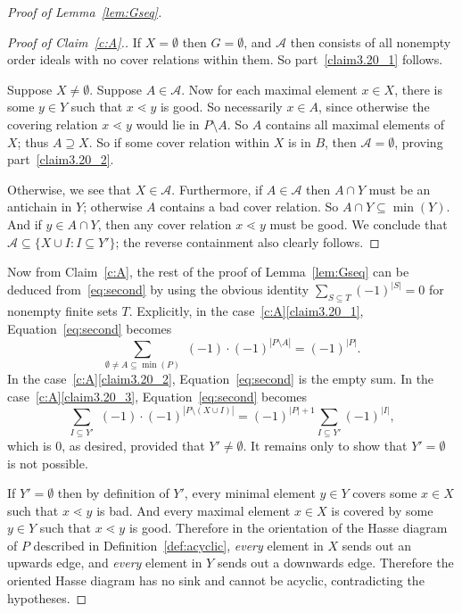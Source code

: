 \documentclass[11pt]{article}
\theoremstyle{definition}
\begin{document}
\begin{proof}[Proof of Lemma~\ref{lem:Gseq}]
\begin{proof}[Proof of Claim~\ref{c:A}.] If $X=\emptyset$ then $G=\emptyset$, and $\mathcal{A}$ then consists of all nonempty order ideals with no cover relations within them. So part~\eqref{claim3.20_1} follows.

Suppose $X\ne \emptyset$. Suppose $A\in \mathcal{A}$. Now for each maximal element $x\in X$, there is some $y\in Y$ such that $x\lessdot y$ is good. So necessarily $x\in A$, since otherwise the covering relation $x\lessdot y$ would lie in $P\setminus A$. So $A$ contains all maximal elements of $X$; thus $A\supseteq X$. So if some cover relation within $X$ is in $B$, then $\mathcal{A}=\emptyset$, proving part~\eqref{claim3.20_2}. 

Otherwise, we see that $X\in\mathcal{A}$. Furthermore, if $A\in\mathcal{A}$ then $A\cap Y$ must be an antichain in $Y$; otherwise $A$ contains a bad cover relation. So $A\cap Y\subseteq \min(Y)$. And if $y\in A\cap Y$, then any cover relation $x\lessdot y$ must be good. We conclude that $\mathcal{A} \subseteq \{X\cup I: I\subseteq Y'\}$; the reverse containment also clearly follows.
\end{proof}

Now from Claim~\ref{c:A}, the rest of the proof of Lemma~\ref{lem:Gseq} can be deduced from~\eqref{eq:second} by using the obvious identity 
$\sum_{S\subseteq T} (-1)^{|S|} = 0$
for nonempty finite sets $T$. Explicitly, in the case~\ref{c:A}\eqref{claim3.20_1}, Equation~\eqref{eq:second} becomes 
\[
\sum_{\emptyset\ne A \subseteq \min(P)} \,\,(-1)\cdot(-1)^{|P\setminus A|} = (-1)^{|P|}.
\]
In the case~\ref{c:A}\eqref{claim3.20_2}, Equation~\eqref{eq:second} is the empty sum. 
In the case~\ref{c:A}\eqref{claim3.20_3}, Equation~\eqref{eq:second} becomes
\[
\sum_{I\subseteq Y'} \,\,(-1)\cdot(-1)^{|P\setminus(X \cup I)|} = (-1)^{|P|+1}\sum_{I\subseteq Y'} (-1)^{|I|},
\]
which is $0$, as desired, provided that $Y'\ne \emptyset$. It remains only to show that $Y'=\emptyset$ is not possible.

If $Y'=\emptyset$ then by definition of $Y'$, every minimal element $y\in Y$ covers some $x\in X$ such that $x\lessdot y$ is bad. And every maximal element $x\in X$ is covered by some $y \in Y$ such that $x\lessdot y$ is good. Therefore in the orientation of the Hasse diagram of $P$ described in Definition~\ref{def:acyclic}, \emph{every} element in $X$ sends out an upwards edge, and \emph{every} element in $Y$ sends out a downwards edge. Therefore the oriented Hasse diagram has no sink and cannot be acyclic, contradicting the hypotheses.
\end{proof}
\end{document}
